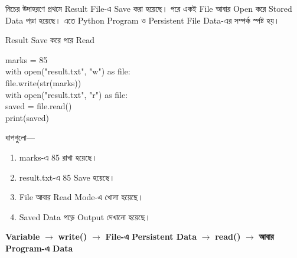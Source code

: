 

নিচের উদাহরণে প্রথমে Result File-এ Save করা হয়েছে। পরে একই File আবার
Open করে Stored Data পড়া হয়েছে। এতে Python Program ও Persistent File
Data-এর সম্পর্ক স্পষ্ট হয়।

\begin{codeoutputbox}{Result Save করে পরে Read}
\noindent
\begin{minipage}[t]{0.58\linewidth}
\vspace{0pt}
\codeheading
\begin{english}
\ttfamily
marks = 85\\[0.4mm]
with open("result.txt", "w") as file:\\
\hspace*{4mm}file.write(str(marks))\\[0.6mm]
with open("result.txt", "r") as file:\\
\hspace*{4mm}saved = file.read()\\[0.6mm]
print(saved)
\end{english}
\end{minipage}
\hfill
\begin{minipage}[t]{0.38\linewidth}
\vspace{0pt}
\outputheading

\begin{center}
\textenglish{}
\end{center}

ধাপগুলো—

\begin{enumerate}
\item \textenglish{\ttfamily marks}-এ 85 রাখা হয়েছে।
\item \textenglish{\ttfamily result.txt}-এ 85 Save হয়েছে।
\item File আবার Read Mode-এ খোলা হয়েছে।
\item Saved Data পড়ে Output দেখানো হয়েছে।
\end{enumerate}
\end{minipage}
\end{codeoutputbox}

\begin{center}
\textbf{Variable}
\(\longrightarrow\)
\textbf{\textenglish{\ttfamily write()}}
\(\longrightarrow\)
\textbf{File-এ Persistent Data}
\(\longrightarrow\)
\textbf{\textenglish{\ttfamily read()}}
\(\longrightarrow\)
\textbf{আবার Program-এ Data}
\end{center}

